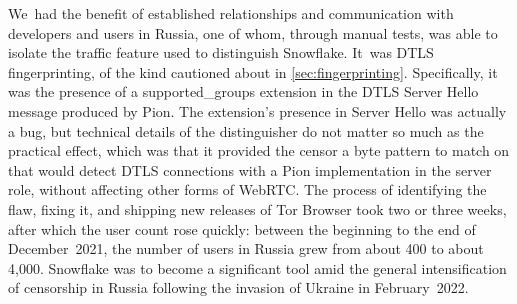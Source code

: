 \documentclass[letterpaper,twocolumn]{article}
\begin{document}
We~had the benefit of established relationships
and communication with developers and users in Russia,
one of whom, through manual tests, was able to
isolate the traffic feature used to distinguish Snowflake.
It~was DTLS fingerprinting,
of the kind cautioned about in \autoref{sec:fingerprinting}.
Specifically, it was the presence of a
\mbox{supported\_groups} extension in the DTLS Server Hello message produced by Pion.
The extension's presence in Server Hello was actually a bug,
but technical details of the distinguisher do not matter
so much as the practical effect,
which was that it provided the censor a byte pattern to match on
that would detect DTLS connections with a Pion implementation in the server role,
without affecting other forms of WebRTC.
The process of identifying the flaw, fixing it,
and shipping new releases of Tor Browser took two or three weeks,
after which the user count rose quickly:
between the beginning to the end of December~2021,
the number of users in Russia grew from about 400 to about 4,000.
Snowflake was to become a significant tool
amid the general intensification of censorship in Russia
following the invasion of Ukraine in February~2022.
\end{document}
